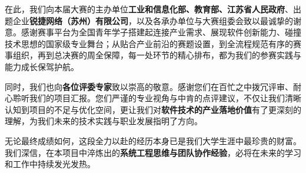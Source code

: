 在此，我们向本届大赛的主办单位\textbf{工业和信息化部、教育部、江苏省人民政府}、出题企业\textbf{锐捷网络（苏州）有限公司}，以及各承办单位与大赛组委会致以最诚挚的谢意。感谢赛事平台为全国青年学子搭建起连接产业需求、展现软件创新能力、碰撞技术思想的国家级专业舞台；从贴合产业前沿的赛题设置，到全流程规范有序的赛事组织，再到总决赛的周全保障，每一处环节的精心排布，都为我们的参赛实践与能力成长保驾护航。

同时，我们也向\textbf{各位评委专家}致以崇高的敬意。感谢您们在百忙之中拨冗评审、耐心聆听我们的项目汇报。您们严谨的专业视角与中肯的点评建议，不仅让我们清晰认知到项目的不足与优化空间，更让我们对\textbf{软件技术的产业落地价值}有了更深刻的理解，为我们未来的技术实践与职业发展指明了方向。

无论最终成绩如何，这段全力以赴的经历本身已是我们大学生涯中最珍贵的财富。我们深信，在本项目中淬炼出的\textbf{系统工程思维与团队协作经验}，必将在未来的学习和工作中持续发光发热。
